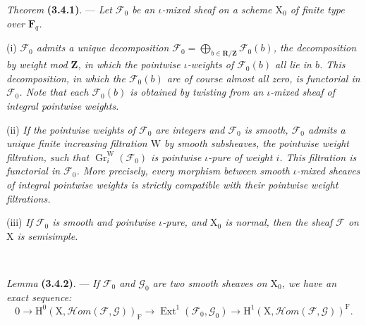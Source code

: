 \documentclass[11pt,leqno]{article}
\newcommand{\Page}[1]{\ifvmode\noindent\else\unskip\ \fi{\footnotesize\textcolor{gray}{[p.\,#1]}}\ \ignorespaces}
\begin{document}
\textit{Theorem} \textbf{(3.4.1)}. — \textit{Let \(\mathscr{F}_0\) be an \(\iota\)-mixed sheaf on a scheme \(\mathrm{X}_0\) of finite type over \(\mathbf{F}_q\).}

(i) \textit{\(\mathscr{F}_0\) admits a unique decomposition \(\mathscr{F}_0=\displaystyle\bigoplus_{b\in\mathbf{R}/\mathbf{Z}}\mathscr{F}_0(b)\), the \textup{decomposition by weight mod \(\mathbf{Z}\)}, in which the pointwise \(\iota\)-weights of \(\mathscr{F}_0(b)\) all lie in \(b\). This decomposition, in which the \(\mathscr{F}_0(b)\) are of course almost all zero, is functorial in \(\mathscr{F}_0\). Note that each \(\mathscr{F}_0(b)\) is obtained by twisting from an \(\iota\)-mixed sheaf of integral pointwise weights.}

(ii) \textit{If the pointwise weights of \(\mathscr{F}_0\) are integers and \(\mathscr{F}_0\) is smooth, \(\mathscr{F}_0\) admits a unique finite increasing filtration \(\mathrm{W}\) by smooth subsheaves, the \textup{pointwise weight filtration}, such that \(\operatorname{Gr}_i^{\mathrm{W}}(\mathscr{F}_0)\) is pointwise \(\iota\)-pure of weight \(i\). This filtration is functorial in \(\mathscr{F}_0\). More precisely, every morphism between smooth \(\iota\)-mixed sheaves of integral pointwise weights is strictly compatible with their pointwise weight filtrations.}

(iii) \textit{If \(\mathscr{F}_0\) is smooth and pointwise \(\iota\)-pure, and \(\mathrm{X}_0\) is normal, then the sheaf \(\mathscr{F}\) on \(\mathrm{X}\) is semisimple.}

\Page{208}

\textit{Lemma} \textbf{(3.4.2)}. — \textit{If \(\mathscr{F}_0\) and \(\mathscr{G}_0\) are two smooth sheaves on \(\mathrm{X}_0\), we have an exact sequence:}
\[
0\to\mathrm{H}^0(\mathrm{X},\mathscr{H}\!om(\mathscr{F},\mathscr{G}))_{\mathrm{F}}
\to\operatorname{Ext}^1(\mathscr{F}_0,\mathscr{G}_0)
\to\mathrm{H}^1(\mathrm{X},\mathscr{H}\!om(\mathscr{F},\mathscr{G}))^{\mathrm{F}}.
\]
\end{document}
